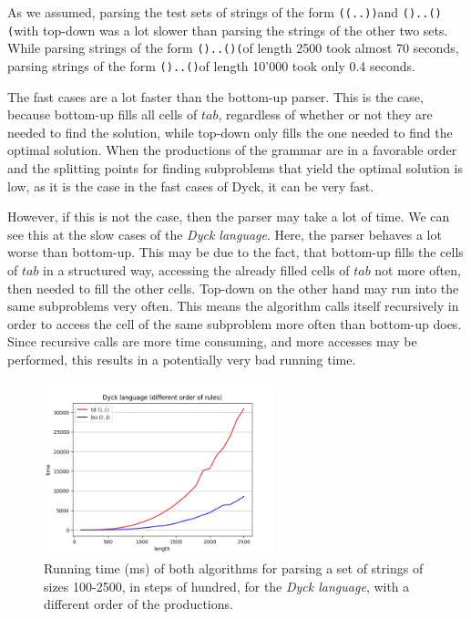 As we assumed, parsing the test sets of strings of the form \texttt{((..))}and \texttt{()..()(}with top-down was a lot slower than parsing the strings of the other two sets.
While parsing strings of the form \texttt{()..()(}of length 2500 took almost 70 seconds, parsing strings of the form \texttt{()..()}of length 10'000 took only 0.4 seconds.

The fast cases are a lot faster than the bottom-up parser.
This is the case, because bottom-up fills all cells of $tab$, regardless of whether or not they are needed to find the solution, while top-down only fills the one needed to find the optimal solution.
When the productions of the grammar are in a favorable order and the splitting points for finding subproblems that yield the optimal solution is low, as it is the case in the fast cases of Dyck, it can be very fast.

However, if this is not the case, then the parser may take a lot of time.
We can see this at the slow cases of the \textit{Dyck language}.
Here, the parser behaves a lot worse than bottom-up.
This may be due to the fact, that bottom-up fills the cells of $tab$ in a structured way, accessing the already filled cells of $tab$ not more often, then needed to fill the other cells.
Top-down on the other hand may run into the same subproblems very often.
This means the algorithm calls itself recursively in order to access the cell of the same subproblem more often than bottom-up does.
Since recursive calls are more time consuming, and more accesses may be performed, this results in a potentially very bad running time.

\begin{figure}[!ht]
    \centering
    \includegraphics[width=0.6\textwidth]{Resources/t_dyck_order.jpg}
    \caption{Running time (ms) of both algorithms for parsing a set of strings of sizes 100-2500, in steps of hundred, for the \textit{Dyck language}, with a different order of the productions.}
    \label{fig:t_dyck_order}
\end{figure}

